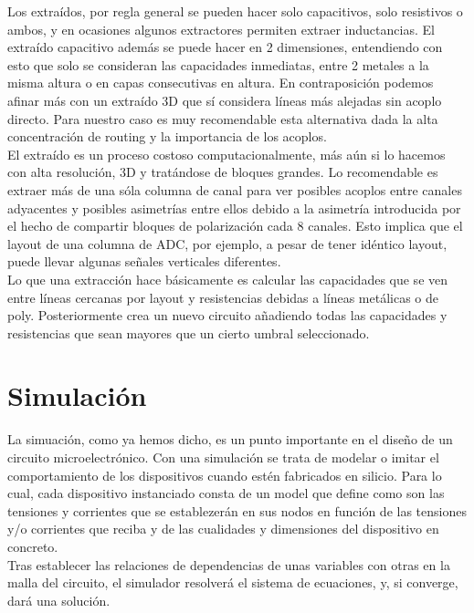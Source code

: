 Los extraídos, por regla general se pueden hacer solo capacitivos, solo resistivos
o ambos, y en ocasiones algunos extractores permiten extraer inductancias. El extraído
capacitivo además se puede hacer en 2 dimensiones, entendiendo con esto que solo
se consideran las capacidades inmediatas, entre 2 metales a la misma altura o
en capas consecutivas en altura. En contraposición podemos afinar más con un
extraído 3D que sí considera líneas más alejadas sin acoplo directo. Para nuestro
caso es muy recomendable esta alternativa dada la alta concentración de routing y
la importancia de los acoplos.\\

El extraído es un proceso costoso computacionalmente, más aún si lo hacemos con alta
resolución, 3D y tratándose de bloques grandes. Lo recomendable es extraer más de una
sóla columna de canal para ver posibles acoplos entre canales adyacentes y posibles
asimetrías entre ellos debido a la asimetría introducida por el hecho de compartir
bloques de polarización cada 8 canales. Esto implica que el layout de una columna
de ADC, por ejemplo, a pesar de tener idéntico layout, puede llevar algunas señales
verticales diferentes.\\

Lo que una extracción hace básicamente es calcular las capacidades que se ven
entre líneas cercanas por layout y resistencias debidas a líneas metálicas o
de poly. Posteriormente crea un nuevo circuito añadiendo todas las capacidades
y resistencias que sean mayores que un cierto umbral seleccionado.\\

\section{Simulación}\label{cap:simulacion}

La simuación, como ya hemos dicho, es un punto importante en el diseño de un circuito
microelectrónico. Con una simulación se trata de modelar o imitar el comportamiento
de los dispositivos cuando estén fabricados en silicio. Para lo cual, cada
dispositivo instanciado consta de un model que define como son las tensiones y
corrientes que se establezerán en sus nodos en función de las tensiones y/o
corrientes que reciba y de las cualidades y dimensiones del dispositivo en concreto.\\

Tras establecer las relaciones de dependencias de unas variables con otras en la malla
del circuito, el simulador resolverá el sistema de ecuaciones, y, si converge, dará
una solución.\\

